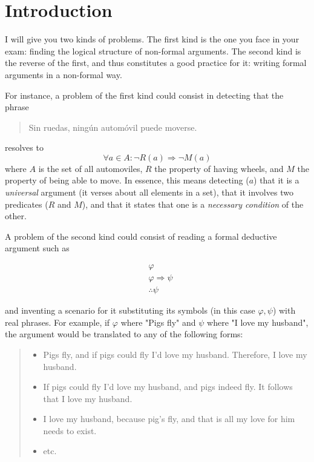 \documentclass[a4paper, 12pt]{article}
\begin{document}
\section{Introduction}

I will give you two kinds of problems. The first kind is the one you face in
your exam: finding the logical structure of non-formal arguments. The second
kind is the reverse of the first, and thus constitutes a good practice for it:
writing formal arguments in a non-formal way. 

For instance, a problem of the first kind could consist in detecting that the 
phrase 

\begin{quote}
    Sin ruedas, ningún automóvil puede moverse.
\end{quote}

resolves to $$\forall a \in A : \neg R(a) \Rightarrow \neg M(a)$$ where $A$ is
the set of all automoviles, $R$ the property of having wheels, and $M$ the
property of being able to move. In essence, this means detecting ($a$) that it
is a \textit{universal} argument (it verses about all elements in a set),
that it involves two predicates ($R$ and $M$), and that it states that 
one is a \textit{necessary condition} of the other.

A problem of the second kind could consist of reading a formal deductive argument such as 

\begin{align*}
    &\varphi \\ 
    &\varphi \Rightarrow \psi \\ 
    &\therefore \psi
\end{align*}

and inventing a scenario for it substituting its symbols (in this case $\varphi, \psi$) with 
real phrases. For example, if $\varphi$ where "Pigs fly" and $\psi$ where "I love 
my husband", the argument would be translated to any of the following forms:

\begin{quote}
    \begin{itemize}
        \item Pigs fly, and if pigs could fly I'd love my husband. Therefore, I love my husband. 
        \item If pigs could fly I'd love my husband, and pigs indeed fly. It follows that I love 
            my husband.
        \item I love my husband, because pig's fly, and that is all my love for him needs to 
            exist.
        \item etc.
    \end{itemize}
\end{quote}
\end{document}

